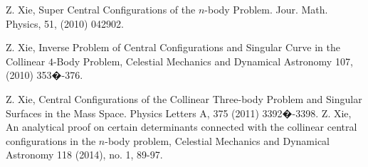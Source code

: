 \documentclass[11pt,leqno]{article}
\theoremstyle{definition}
\theoremstyle{remark}
\numberwithin{equation}{section}
\begin{document}
\begin{thebibliography}{00}
  Z. Xie, Super Central Configurations of the $n$-body Problem.
 Jour. Math. Physics, 51, (2010) 042902.


 Z. Xie, Inverse Problem of Central Configurations and Singular Curve in the Collinear $4$-Body
  Problem,  Celestial Mechanics and Dynamical
Astronomy 107, (2010) 353�-376.

 Z. Xie, Central Configurations of the Collinear Three-body Problem and Singular Surfaces in the Mass Space. Physics Letters A, 375 (2011) 3392�-3398.
 Z. Xie, An analytical proof on certain determinants connected with the collinear central configurations in the $n$-body problem, Celestial Mechanics and Dynamical
Astronomy 118 (2014), no. 1, 89-97.
\end{thebibliography}
\end{document}
